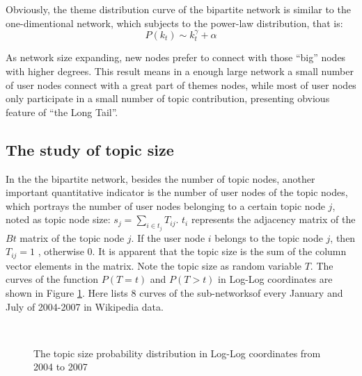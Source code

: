 \documentclass{elsarticle}
\begin{document}
Obviously, the theme distribution curve of the bipartite network is
similar to the one-dimentional network, which subjects to the power-law distribution, that is: 
\begin{equation}
  \label{eq:2}
  P(k_t)\sim k_t^{\gamma}+\alpha
\end{equation}


As network size expanding,  new nodes prefer to connect with those
“big” nodes with higher degrees. This result means in a enough large
network a small number of user nodes connect with a great part of
themes nodes, while most of user nodes only participate in a small number of topic contribution, presenting obvious feature of “the Long Tail”. 
\subsection{The study of topic size}
\label{sec:topic-size}

In the the bipartite network, besides the number of topic
nodes, another important quantitative indicator is the number of user
nodes of the topic nodes, which portrays the number of user nodes
belonging to a certain  topic node $j$, noted as topic node size: $s_j
= \sum_{i \in t_j}T_{ij}$. $t_i$  represents
the adjacency matrix of the $Bt$ matrix of the topic node $j$. If the user
node $i$ belongs to the topic node $j$, then $T_{ij}=1$ , otherwise 0. It is apparent that the topic size is the sum of the column vector
elements in the matrix. Note the topic size as random variable $T$. The curves
of the function $P(T=t)$  and  $P(T>t)$  in Log-Log coordinates are
shown in Figure \ref{fig:topic-size}.  Here lists 8 curves of the sub-networksof every
January and July of 2004-2007 in Wikipedia data.



\begin{figure}[htpb]
  \centering
  \subfigure[ ]{
     \scalebox{0.18}{\texttt{[image: 07-1]}}
   } \quad
  \subfigure[ ]{ 
       \scalebox{0.18}{\texttt{[image: 07-2]}}
   } 
   \
    \subfigure[ ]{
     \scalebox{0.18}{\texttt{[image: 07-3]}}
   } \quad
  \subfigure[ ]{ 
       \scalebox{0.18}{\texttt{[image: 07-4]}}
   } 
  

    \subfigure[ ]{
     \scalebox{0.18}{\texttt{[image: 07-5]}}
   } \quad
  \subfigure[ ]{ 
       \scalebox{0.18}{\texttt{[image: 07-6]}}
   } 

    \subfigure[ ]{
     \scalebox{0.18}{\texttt{[image: 07-7]}}
   } \quad
  \subfigure[ ]{ 
       \scalebox{0.18}{\texttt{[image: 07-8]}}
   } 
   \caption{The topic size probability distribution in Log-Log
     coordinates from 2004 to 2007}
   \label{fig:topic-size}
\end{figure}
\end{document}
